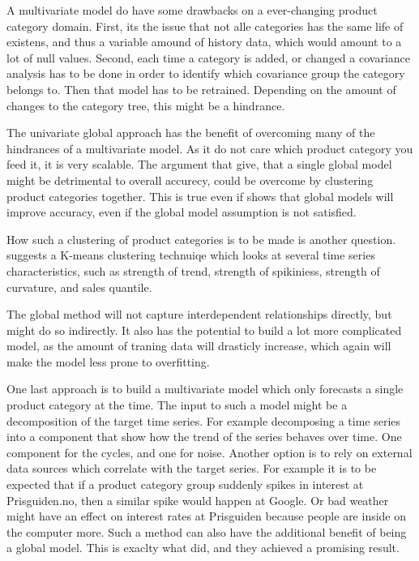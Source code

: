 A multivariate model do have some drawbacks on a ever-changing product category domain.
First, its the issue that not alle categories has the same life of existens, and thus a variable
amound of history data, which would amount to a lot of null values.
Second, each time a category is added, or changed a covariance analysis has to be done in order to identify
which covariance group the category belongs to. Then that model has to be retrained.
Depending on the amount of changes to the category tree, this might be a hindrance.

The univariate global approach has the benefit of overcoming many of the hindrances of a multivariate model.
As it do not care which product category you feed it, it is very scalable. The argument that \cite{Bandara2017}
give, that a single global model might be detrimental to overall accurecy, could be overcome by clustering product categories together. This is true even if \cite{Rabanser2020}
shows that global models will improve accuracy, even if the global model assumption is not satisfied.

How such a clustering of product categories is to be made is another question.
\cite{Bandara2017} suggests a K-means clustering technuiqe
which looks at several time series characteristics, such as 
strength of trend, strength of spikiniess, strength of curvature,
and sales quantile.

The global method will not capture interdependent relationships directly,
but might do so indirectly. It also has the potential to build a lot more complicated model,
as the amount of traning data will drasticly increase, which again will make the model less prone to 
overfitting.

One last approach is to build a multivariate model which only forecasts a single product category at the time.
The input to such a model might be a decomposition of the target time series. 
For example decomposing a time series into a component that show how the trend of the series behaves over time.
One component for the cycles, and one for noise.
Another option is to rely on external data sources which correlate with the target series.
For example it is to be expected that if a product category group suddenly spikes in interest at Prisguiden.no,
then a similar spike would happen at Google.
Or bad weather might have an effect on interest rates at Prisguiden because people are inside on the computer more.
Such a method can also have the additional benefit of being a global model.
This is exaclty what \cite{Laptev} did, and they achieved a promising result.

